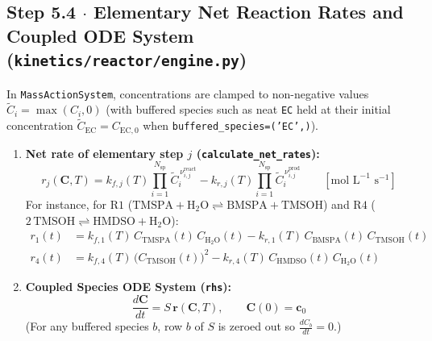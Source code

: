 \documentclass[11pt,a4paper]{article}
\begin{document}
\subsection*{Step 5.4 $\cdot$ Elementary Net Reaction Rates and Coupled ODE System (\texttt{kinetics/\allowbreak{}reactor/\allowbreak{}engine.py})}

In \texttt{MassActionSystem}, concentrations are clamped to non-negative values $\tilde{C}_i = \max(C_i, 0)$ (with buffered species such as neat \texttt{EC} held at their initial concentration $\tilde{C}_{\text{EC}} = C_{\text{EC}, 0}$ when \texttt{buffered\_\allowbreak{}species=('EC',\allowbreak{})}).

\begin{enumerate}[leftmargin=1.8em]
    \item \textbf{Net rate of elementary step $j$ (\texttt{calculate\_\allowbreak{}net\_\allowbreak{}rates}):}
    \begin{equation}
    r_j(\mathbf{C}, T) = k_{f,j}(T) \prod_{i=1}^{N_{\text{sp}}} \tilde{C}_i^{\,\nu_{i,j}^{\text{react}}} - k_{r,j}(T) \prod_{i=1}^{N_{\text{sp}}} \tilde{C}_i^{\,\nu_{i,j}^{\text{prod}}} \qquad [\text{mol L}^{-1}\text{ s}^{-1}]
    \end{equation}
    For instance, for $\text{R1}$ ($\text{TMSPA} + \text{H}_2\text{O} \rightleftharpoons \text{BMSPA} + \text{TMSOH}$) and $\text{R4}$ ($2\,\text{TMSOH} \rightleftharpoons \text{HMDSO} + \text{H}_2\text{O}$):
    \begin{align}
    r_1(t) &= k_{f,1}(T)\, C_{\text{TMSPA}}(t)\, C_{\text{H}_2\text{O}}(t) - k_{r,1}(T)\, C_{\text{BMSPA}}(t)\, C_{\text{TMSOH}}(t) \\
    r_4(t) &= k_{f,4}(T)\, \big(C_{\text{TMSOH}}(t)\big)^2 - k_{r,4}(T)\, C_{\text{HMDSO}}(t)\, C_{\text{H}_2\text{O}}(t)
    \end{align}

    \item \textbf{Coupled Species ODE System (\texttt{rhs}):}
    \begin{equation}
    \frac{d\mathbf{C}}{dt} = S \, \mathbf{r}(\mathbf{C}, T), \qquad \mathbf{C}(0) = \mathbf{c}_0
    \end{equation}
    (For any buffered species $b$, row $b$ of $S$ is zeroed out so $\frac{dC_b}{dt} = 0$.)


\end{enumerate}
\end{document}
